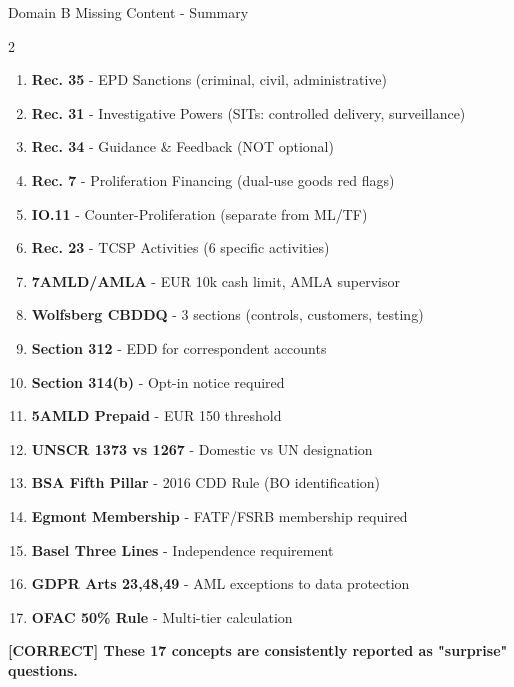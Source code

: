 \documentclass[11pt,a4paper]{beamer}
\newcommand{\greennote}[1]{\textcolor{green!50!black}{\textbf{[CORRECT] #1}}}
\begin{document}
\begin{frame}{Domain B Missing Content - Summary}
\begin{multicols}{2}
\begin{enumerate}
\item \textbf{Rec. 35} - EPD Sanctions (criminal, civil, administrative)
\item \textbf{Rec. 31} - Investigative Powers (SITs: controlled delivery, surveillance)
\item \textbf{Rec. 34} - Guidance \& Feedback (NOT optional)
\item \textbf{Rec. 7} - Proliferation Financing (dual-use goods red flags)
\item \textbf{IO.11} - Counter-Proliferation (separate from ML/TF)
\item \textbf{Rec. 23} - TCSP Activities (6 specific activities)
\item \textbf{7AMLD/AMLA} - EUR 10k cash limit, AMLA supervisor
\item \textbf{Wolfsberg CBDDQ} - 3 sections (controls, customers, testing)
\item \textbf{Section 312} - EDD for correspondent accounts
\item \textbf{Section 314(b)} - Opt-in notice required
\item \textbf{5AMLD Prepaid} - EUR 150 threshold
\item \textbf{UNSCR 1373 vs 1267} - Domestic vs UN designation
\item \textbf{BSA Fifth Pillar} - 2016 CDD Rule (BO identification)
\item \textbf{Egmont Membership} - FATF/FSRB membership required
\item \textbf{Basel Three Lines} - Independence requirement
\item \textbf{GDPR Arts 23,48,49} - AML exceptions to data protection
\item \textbf{OFAC 50\% Rule} - Multi-tier calculation
\end{enumerate}
\end{multicols}
\greennote{These 17 concepts are consistently reported as "surprise" questions.}
\end{frame}
\end{document}
